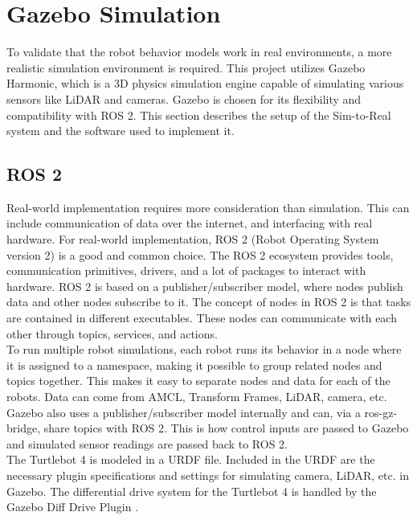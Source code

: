 \section{Gazebo Simulation}
To validate that the robot behavior models work in real environments, a more realistic simulation environment is required. This project utilizes Gazebo Harmonic, which is a 3D physics simulation engine capable of simulating various sensors like LiDAR and cameras. Gazebo is chosen for its flexibility and compatibility with ROS 2.
This section describes the setup of the {\color{red}Sim-to-Real} system and the software used to implement it.

\subsection{ROS 2}\label{sub:ros_2}
Real-world implementation requires more consideration than simulation. This can include communication of data over the internet, and interfacing with real hardware.
For real-world implementation, ROS 2 (Robot Operating System version 2) is a good and common choice. The ROS 2 ecosystem provides tools, communication primitives, drivers, and a lot of packages to interact with hardware. ROS 2 is based on a publisher/subscriber model, where nodes publish data and other nodes subscribe to it.
The concept of nodes in ROS 2 is that tasks are contained in different executables. These nodes can communicate with each other through topics, services, and actions. \\

To run multiple robot simulations, each robot runs its behavior in a node where it is assigned to a namespace, making it possible to group related nodes and topics together.
This makes it easy to separate nodes and data for each of the robots. Data can come from AMCL, Transform Frames, LiDAR, camera, etc. \\

Gazebo also uses a publisher/subscriber model internally and can, via a ros-gz-bridge, share topics with ROS 2. This is how control inputs are passed to Gazebo and simulated sensor readings are passed back to ROS 2. \\

The Turtlebot 4 is modeled in a URDF file. Included in the URDF are the necessary plugin specifications and settings for simulating camera, LiDAR, etc. in Gazebo. The differential drive system for the Turtlebot 4 is handled by the Gazebo Diff Drive Plugin \cite{gz-diff-drive}. \\

